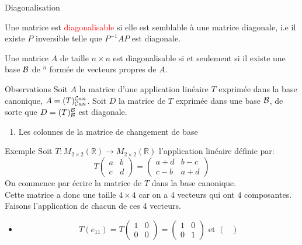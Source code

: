 \begin{parag}{Diagonalisation}
    \begin{definition}
        Une matrice est \textcolor{red}{diagonalisable} si elle est semblable à une matrice diagonale, i.e il existe $P$ inversible telle que $P^{-1}AP$ est diagonale.
    \end{definition}
    \begin{theoreme}
        Une matrice $A$ de taille $n\times n$ est diagonalisable si et seulement si il existe une base $\mathcal{B}$ de \R$^n$ formée de vecteurs propres de $A$.
    \end{theoreme}
    \begin{subparag}{Observations}
        Soit $A$ la matrice d'une application linéaire $T$ exprimée dans la base canonique, $A = (T)_{\mathcal{C} an}^{\mathcal{C} an}$. Soit $D$ la matrice  de $T$ exprimée dans une base $\mathcal{B}$, de sorte que $D = (T)_{\mathcal{B}}^{\mathcal{B}}$ est diagonale.
        \begin{enumerate}
            \item Les colonnes de la matrice de changement de base 
        \end{enumerate}
    \end{subparag}
    \begin{subparag}{Exemple}
        Soit $T: M_{2\times 2}(\mathbb{R}) \to M_{2\times 2}(\mathbb{R})$ l’application linéaire définie par:
        \[T\begin{pmatrix}
            a & b \\ c & d
        \end{pmatrix} = \begin{pmatrix}
            a + d & b - c\\ c-b & a + d
        \end{pmatrix}\]
        On commence par écrire la matrice de $T$ dans la base canonique.
        \\
        Cette matrice a donc une taille $4 \times 4$ car on a $4$ vecteurs qui ont $4$ composantes. Faisons l’application de chacun de ces 4 vecteurs.
        \begin{itemize}
            \item \[T(e_{11}) = T\begin{pmatrix}
                1 & 0 \\ 0 & 0
            \end{pmatrix} = \begin{pmatrix}
                1 & 0 \\ 0 & 1
            \end{pmatrix} \text{ et } \begin{pmatrix}

\end{pmatrix}\]
\end{itemize}
\end{subparag}
\end{parag}
